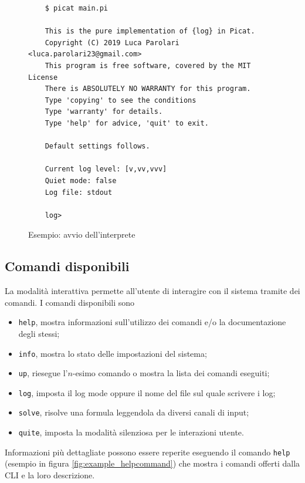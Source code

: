 \documentclass[12pt,a4paper,openright]{book} %
\begin{document}
\begin{figure}
	\begin{verbatim}
	$ picat main.pi
	
	This is the pure implementation of {log} in Picat.
	Copyright (C) 2019 Luca Parolari <luca.parolari23@gmail.com>
	This program is free software, covered by the MIT License
	There is ABSOLUTELY NO WARRANTY for this program.
	Type 'copying' to see the conditions
	Type 'warranty' for details.
	Type 'help' for advice, 'quit' to exit.
	
	Default settings follows.
	
	Current log level: [v,vv,vvv]
	Quiet mode: false
	Log file: stdout
	
	log> 
	\end{verbatim}
	\caption{Esempio: avvio dell'interprete}
	\label{fig:example_interpreterstart}
\end{figure}

\subsection{Comandi disponibili}

La modalità interattiva permette all'utente di interagire con il sistema tramite dei comandi. I comandi disponibili sono
\begin{itemize}
	\item \texttt{help}, mostra informazioni sull'utilizzo dei comandi e/o la documentazione degli stessi;
	\item \texttt{info}, mostra lo stato delle impostazioni del sistema;
	\item \texttt{up}, riesegue l'$n$-esimo comando o mostra la lista dei comandi eseguiti;
	\item \texttt{log}, imposta il log mode oppure il nome del file sul quale scrivere i log;
	\item \texttt{solve}, risolve una formula leggendola da diversi canali di input;
	\item \texttt{quite}, imposta la modalità silenziosa per le interazioni utente.
\end{itemize}

Informazioni più dettagliate possono essere reperite eseguendo il comando \texttt{help} (esempio in figura \ref{fig:example_helpcommand}) che mostra i comandi offerti dalla CLI e la loro descrizione.
\end{document}
